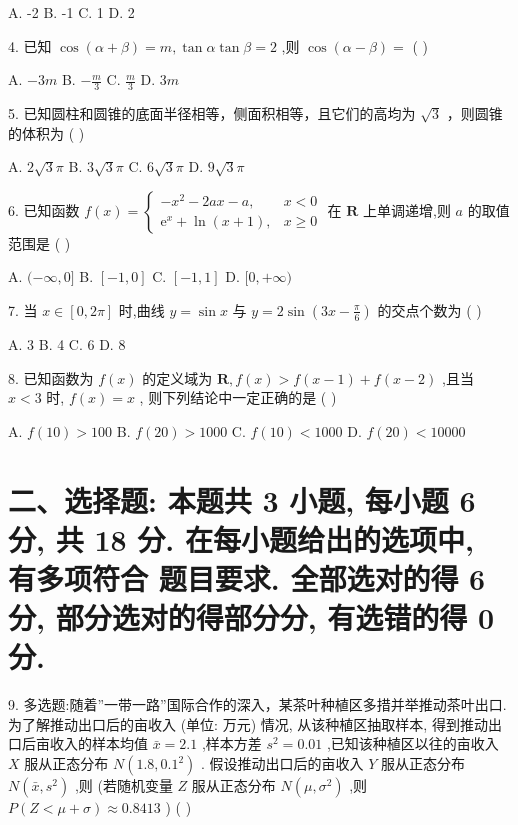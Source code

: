 \documentclass[10pt]{article}
\begin{document}
A. -2 B. -1 C. 1 D. 2

4. 已知 \(\cos \left( {\alpha  + \beta }\right)  = m,\tan \alpha \tan \beta  = 2\) ,则 \(\cos \left( {\alpha  - \beta }\right)  =\) ( )

A. \(- {3m}\) B. \(- \frac{m}{3}\) C. \(\frac{m}{3}\) D. \({3m}\)

5. 已知圆柱和圆锥的底面半径相等，侧面积相等，且它们的高均为 \(\sqrt{3}\) ，则圆锥的体积为 ( )

A. \(2\sqrt{3}\pi\) B. \(3\sqrt{3}\pi\) C. \(6\sqrt{3}\pi\) D. \(9\sqrt{3}\pi\)

6. 已知函数 \(f\left( x\right)  = \left\{  \begin{array}{ll}  - {x}^{2} - {2ax} - a, & x < 0 \\  {\mathrm{e}}^{x} + \ln \left( {x + 1}\right) , & x \geq  0 \end{array}\right.\) 在 \(\mathbf{R}\) 上单调递增,则 \(a\) 的取值范围是 ( )

A. \(( - \infty ,0\rbrack\) B. \(\left\lbrack  {-1,0}\right\rbrack\) C. \(\left\lbrack  {-1,1}\right\rbrack\) D. \(\lbrack 0, + \infty )\)

7. 当 \(x \in  \left\lbrack  {0,{2\pi }}\right\rbrack\) 时,曲线 \(y = \sin x\) 与 \(y = 2\sin \left( {{3x} - \frac{\pi }{6}}\right)\) 的交点个数为 ( )

A. 3 B. 4 C. 6 D. 8

8. 已知函数为 \(f\left( x\right)\) 的定义域为 \(\mathbf{R},f\left( x\right)  > f\left( {x - 1}\right)  + f\left( {x - 2}\right)\) ,且当 \(x < 3\) 时, \(f\left( x\right)  = x\) , 则下列结论中一定正确的是 ( )

A. \(f\left( {10}\right)  > {100}\) B. \(f\left( {20}\right)  > {1000}\) C. \(f\left( {10}\right)  < {1000}\) D. \(f\left( {20}\right)  < {10000}\)

\section*{二、选择题: 本题共 3 小题, 每小题 6 分, 共 18 分. 在每小题给出的选项中, 有多项符合 题目要求. 全部选对的得 6 分, 部分选对的得部分分, 有选错的得 0 分.}

9. 多选题:随着”一带一路”国际合作的深入，某茶叶种植区多措并举推动茶叶出口. 为了解推动出口后的亩收入 (单位: 万元) 情况, 从该种植区抽取样本, 得到推动出口后亩收入的样本均值 \(\bar{x} = {2.1}\) ,样本方差 \({s}^{2} = {0.01}\) ,已知该种植区以往的亩收入 \(X\) 服从正态分布 \(N\left( {{1.8},{0.1}^{2}}\right)\) . 假设推动出口后的亩收入 \(Y\) 服从正态分布 \(N\left( {\bar{x},{s}^{2}}\right)\) ,则 (若随机变量 \(Z\) 服从正态分布 \(N\left( {\mu ,{\sigma }^{2}}\right)\) ,则 \(P\left( {Z < \mu  + \sigma }\right)  \approx  {0.8413}\) ) ( )
\end{document}
